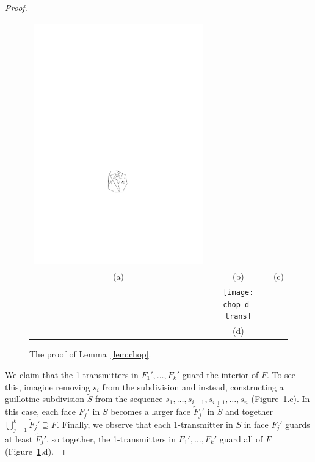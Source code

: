 \documentclass{article}
\begin{document}
\begin{proof}
\begin{figure}
\begin{center}
\begin{tabular}{ccc}
      \includegraphics{chop-c}  \\  
      (a) & (b) & (c) \\[1ex]
      & \texttt{[image: chop-d-trans]} &  \\  
      & (d) &  \\  
    \end{tabular}
  \end{center}
  \caption{The proof of Lemma~\ref{lem:chop}.}
  \label{fig:chop}
\end{figure}

We claim that the 1-transmitters in $F_1',\ldots,F_k'$ guard the interior
of $F$.  To see this, imagine removing $s_i$ from the subdivision and
instead, constructing a guillotine subdivision $\tilde{S}$ from the sequence
$s_1,\ldots,s_{i-1},s_{i+1},\ldots,s_n$ (Figure~\ref{fig:chop}.c).
In this case, each face $F_j'$ in $S$ becomes a larger face $\tilde F_j'$
in $\tilde{S}$ and together $\bigcup_{j=1}^k \tilde F_j'\supseteq F$.  Finally,
we observe that each 1-transmitter in $S$ in face $F_j'$ guards at least
$\tilde F_j'$, so together, the 1-transmitters in $F_1',\ldots,F_k'$
guard all of $F$ (Figure~\ref{fig:chop}.d).
\end{proof}
\end{document}
